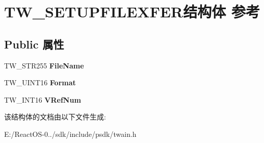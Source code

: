 \hypertarget{struct_t_w___s_e_t_u_p_f_i_l_e_x_f_e_r}{}\section{T\+W\+\_\+\+S\+E\+T\+U\+P\+F\+I\+L\+E\+X\+F\+E\+R结构体 参考}
\label{struct_t_w___s_e_t_u_p_f_i_l_e_x_f_e_r}
\subsection*{Public 属性}
\begin{DoxyCompactItemize}
\item 
\mbox{\label{struct_t_w___s_e_t_u_p_f_i_l_e_x_f_e_r_a79d3c9eef6f45f5243b87784811ea6ff}} 
T\+W\+\_\+\+S\+T\+R255 {\bfseries File\+Name}
\item 
\mbox{\label{struct_t_w___s_e_t_u_p_f_i_l_e_x_f_e_r_a5c017b25bedf60239e880dc332985e8a}} 
T\+W\+\_\+\+U\+I\+N\+T16 {\bfseries Format}
\item 
\mbox{\label{struct_t_w___s_e_t_u_p_f_i_l_e_x_f_e_r_a458d41bd345f9c2ce04c0e1fbf8fc091}} 
T\+W\+\_\+\+I\+N\+T16 {\bfseries V\+Ref\+Num}
\end{DoxyCompactItemize}


该结构体的文档由以下文件生成\+:\begin{DoxyCompactItemize}
\item 
E\+:/\+React\+O\+S-\/0../sdk/include/psdk/twain.\+h\end{DoxyCompactItemize}
